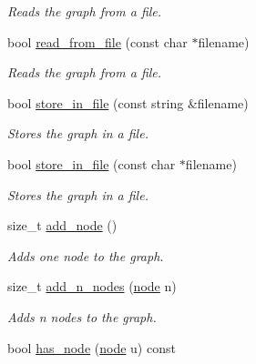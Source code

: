 \begin{DoxyCompactItemize}
\begin{DoxyCompactList}\small\item\em Reads the graph from a file. \end{DoxyCompactList}\item 
bool \hyperlink{classlgraph_1_1utils_1_1uxgraph_a3e8b1f79b060234dced303a4171fae92}{read\+\_\+from\+\_\+file} (const char $\ast$filename)\hypertarget{classlgraph_1_1utils_1_1uxgraph_a3e8b1f79b060234dced303a4171fae92}{}\label{classlgraph_1_1utils_1_1uxgraph_a3e8b1f79b060234dced303a4171fae92}

\begin{DoxyCompactList}\small\item\em Reads the graph from a file. \end{DoxyCompactList}\item 
bool \hyperlink{classlgraph_1_1utils_1_1uxgraph_a2aef5492b3c18e0a6a9a2e75e2ff9e04}{store\+\_\+in\+\_\+file} (const string \&filename)\hypertarget{classlgraph_1_1utils_1_1uxgraph_a2aef5492b3c18e0a6a9a2e75e2ff9e04}{}\label{classlgraph_1_1utils_1_1uxgraph_a2aef5492b3c18e0a6a9a2e75e2ff9e04}

\begin{DoxyCompactList}\small\item\em Stores the graph in a file. \end{DoxyCompactList}\item 
bool \hyperlink{classlgraph_1_1utils_1_1uxgraph_a1f54ad58bf346fe85e3c94c118854fc7}{store\+\_\+in\+\_\+file} (const char $\ast$filename)\hypertarget{classlgraph_1_1utils_1_1uxgraph_a1f54ad58bf346fe85e3c94c118854fc7}{}\label{classlgraph_1_1utils_1_1uxgraph_a1f54ad58bf346fe85e3c94c118854fc7}

\begin{DoxyCompactList}\small\item\em Stores the graph in a file. \end{DoxyCompactList}\item 
size\+\_\+t \hyperlink{classlgraph_1_1utils_1_1xxgraph_af41baf2c098e872731ad646aeec1b382}{add\+\_\+node} ()
\begin{DoxyCompactList}\small\item\em Adds one node to the graph. \end{DoxyCompactList}\item 
size\+\_\+t \hyperlink{classlgraph_1_1utils_1_1xxgraph_af4f3782c1a55f73c6f34f2f2c26fb404}{add\+\_\+n\+\_\+nodes} (\hyperlink{namespacelgraph_1_1utils_a7bd66ede3805ef121bc2835bd48de0cf}{node} n)
\begin{DoxyCompactList}\small\item\em Adds {\itshape n} nodes to the graph. \end{DoxyCompactList}\item 
bool \hyperlink{classlgraph_1_1utils_1_1xxgraph_a026ab064c2be26790cc1f547be2157c9}{has\+\_\+node} (\hyperlink{namespacelgraph_1_1utils_a7bd66ede3805ef121bc2835bd48de0cf}{node} u) const \hypertarget{classlgraph_1_1utils_1_1xxgraph_a026ab064c2be26790cc1f547be2157c9}{}\label{classlgraph_1_1utils_1_1xxgraph_a026ab064c2be26790cc1f547be2157c9}


\end{DoxyCompactItemize}
